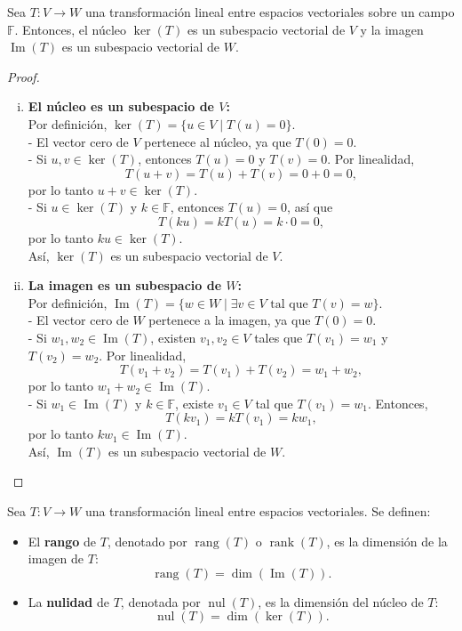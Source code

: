 \begin{theorem}
Sea $T: V \to W$ una transformación lineal entre espacios vectoriales sobre un campo $\mathbb{F}$. Entonces, el núcleo $\ker(T)$ es un subespacio vectorial de $V$ y la imagen $\operatorname{Im}(T)$ es un subespacio vectorial de $W$.
\begin{proof}
\begin{enumerate}[i.]
    \item \textbf{El núcleo es un subespacio de $V$:} \\
    Por definición, $\ker(T) = \{u \in V \mid T(u) = 0\}$.\\
    - El vector cero de $V$ pertenece al núcleo, ya que $T(0) = 0$.\\
    - Si $u, v \in \ker(T)$, entonces $T(u) = 0$ y $T(v) = 0$. Por linealidad,
    \[
    T(u + v) = T(u) + T(v) = 0 + 0 = 0,
    \]
    por lo tanto $u + v \in \ker(T)$.\\
    - Si $u \in \ker(T)$ y $k \in \mathbb{F}$, entonces $T(u) = 0$, así que
    \[
    T(k u) = k T(u) = k \cdot 0 = 0,
    \]
    por lo tanto $k u \in \ker(T)$.\\
    Así, $\ker(T)$ es un subespacio vectorial de $V$.

    \item \textbf{La imagen es un subespacio de $W$:} \\
    Por definición, $\operatorname{Im}(T) = \{w \in W \mid \exists v \in V \text{ tal que } T(v) = w\}$.\\
    - El vector cero de $W$ pertenece a la imagen, ya que $T(0) = 0$.\\
    - Si $w_1, w_2 \in \operatorname{Im}(T)$, existen $v_1, v_2 \in V$ tales que $T(v_1) = w_1$ y $T(v_2) = w_2$. Por linealidad,
    \[
    T(v_1 + v_2) = T(v_1) + T(v_2) = w_1 + w_2,
    \]
    por lo tanto $w_1 + w_2 \in \operatorname{Im}(T)$.\\
    - Si $w_1 \in \operatorname{Im}(T)$ y $k \in \mathbb{F}$, existe $v_1 \in V$ tal que $T(v_1) = w_1$. Entonces,
    \[
    T(k v_1) = k T(v_1) = k w_1,
    \]
    por lo tanto $k w_1 \in \operatorname{Im}(T)$.\\
    Así, $\operatorname{Im}(T)$ es un subespacio vectorial de $W$.
\end{enumerate}
\end{proof}
\end{theorem}

\begin{definition}
Sea $T: V \to W$ una transformación lineal entre espacios vectoriales. Se definen:

\begin{itemize}
    \item El \textbf{rango} de $T$, denotado por $\operatorname{rang}(T)$ o $\operatorname{rank}(T)$, es la dimensión de la imagen de $T$:
    \[
    \operatorname{rang}(T) = \dim(\operatorname{Im}(T)).
    \]
    \item La \textbf{nulidad} de $T$, denotada por $\operatorname{nul}(T)$, es la dimensión del núcleo de $T$:
    \[
    \operatorname{nul}(T) = \dim(\ker(T)).
    \]
\end{itemize}
\end{definition}


